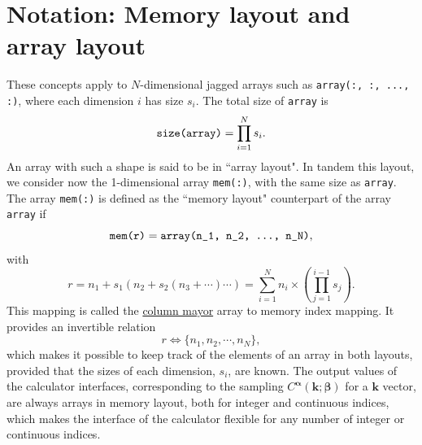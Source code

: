 \documentclass[10pt,a4paper]{article}
\begin{document}
\section{Notation: Memory layout and array layout}\label{sec:notation}
These concepts apply to $N$-dimensional jagged arrays such as \verb|array(:, :, ..., :)|, where each dimension $i$ has size $s_i$. The total size of \verb|array| is
\begin{equation}
\verb|size(array)| = \prod_{i=1}^N s_i.
\end{equation}
An array with such a shape is said to be in ``array layout". In tandem this layout, we consider now the 1-dimensional array \verb|mem(:)|, with the same size as \verb|array|. The array \verb|mem(:)| is defined as the ``memory layout" counterpart of the array \verb|array| if
\begin{equation}
\verb|mem(r)| = \verb|array(n_1, n_2, ..., n_N)|,
\end{equation}
with
\begin{equation}\label{eq:column_mayor_mapping}
r = n_1 + s_1\left(n_2 + s_2\left(n_3 + \cdots\right)\cdots\right) = \sum_{i=1}^N n_i\times \left(\prod_{j=1}^{i-1}s_j\right).
\end{equation}
This mapping is called the \href{https://eli.thegreenplace.net/2015/memory-layout-of-multi-dimensional-arrays}{column mayor} array to memory index mapping. It provides an invertible relation
\begin{equation}
r \Leftrightarrow \{n_1, n_2, \cdots, n_N\},
\end{equation}
which makes it possible to keep track of the elements of an array in both layouts, provided that the sizes of each dimension, $s_i$, are known. The output values of the calculator interfaces, corresponding to the sampling $C^{\bm{\alpha}}(\bm{k}; \bm{\beta})$ for a $\bm{k}$ vector, are always arrays in memory layout, both for integer and continuous indices, which makes the interface of the calculator flexible for any number of integer or continuous indices.
\end{document}
